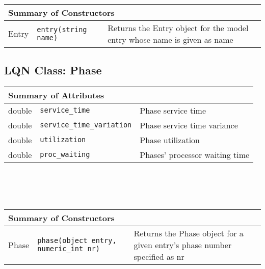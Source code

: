 \\\\\ \\
\begin{tabular}{|p{1.0in}|p{2.3in}||p{2.8in}|}
  \hline
  \multicolumn{3}{|l|}{\textbf{Summary of Constructors}}\\
  \hline
  Entry & {\tt entry(string name)} & Returns the Entry object for the model entry whose name is given as name\\
  \hline
\end{tabular}

\subsection{LQN Class: Phase}
\begin{tabular}{|p{1.0in}|p{2.3in}||p{2.8in}|}
  \hline
  \multicolumn{3}{|l|}{\textbf{Summary of Attributes}}\\
  \hline
  double & {\tt service\_time} & Phase service time\\
  double & {\tt service\_time\_variation} & Phase service time variance\\
  double & {\tt utilization} & Phase utilization\\
  double & {\tt proc\_waiting} & Phases' processor waiting time\\
  \hline
\end{tabular}
\\\\\ \\
\begin{tabular}{|p{1.0in}|p{2.3in}||p{2.8in}|}
  \hline
  \multicolumn{3}{|l|}{\textbf{Summary of Constructors}}\\
  \hline
  Phase & {\tt phase(object entry, numeric\_int nr)} & Returns the Phase object for a given entry's phase number specified as nr\\
  \hline
\end{tabular}

